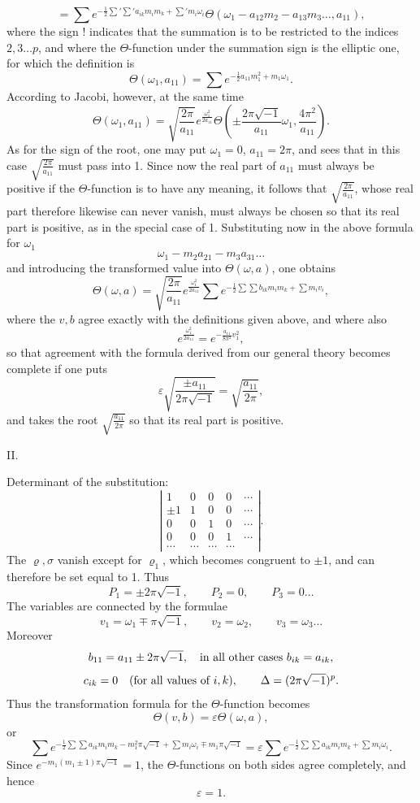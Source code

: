\documentclass[10pt]{article}
\begin{document}
\[
=\sum e^{-\frac12\sum{}'\sum{}'a_{ik}m_im_k+\sum{}'m_i\omega_i}
\Theta(\omega_1-a_{12}m_2-a_{13}m_3\ldots,a_{11}),
\]
where the sign \(!\) indicates that the summation is to be restricted to the indices \(2,3\ldots p\), and where the \(\Theta\)-function under the summation sign is the elliptic one, for which the definition is
\[
\Theta(\omega_1,a_{11})=\sum e^{-\frac12a_{11}m_1^2+m_1\omega_1}.
\]
According to Jacobi, however, at the same time
\[
\Theta(\omega_1,a_{11})=\sqrt{\frac{2\pi}{a_{11}}}
 e^{\frac{\omega_1^2}{2a_{11}}}
\Theta\left(\pm\frac{2\pi\sqrt{-1}}{a_{11}}\omega_1,\frac{4\pi^2}{a_{11}}\right).
\]
As for the sign of the root, one may put \(\omega_1=0\), \(a_{11}=2\pi\), and sees that in this case \(\sqrt{\frac{2\pi}{a_{11}}}\) must pass into 1. Since now the real part of \(a_{11}\) must always be positive if the \(\Theta\)-function is to have any meaning, it follows that \(\sqrt{\frac{2\pi}{a_{11}}}\), whose real part therefore likewise can never vanish, must always be chosen so that its real part is positive, as in the special case of 1. Substituting now in the above formula for \(\omega_1\)
\[
\omega_1-m_2a_{21}-m_3a_{31}\ldots
\]
and introducing the transformed value into \(\Theta(\omega,a)\), one obtains
\[
\Theta(\omega,a)=\sqrt{\frac{2\pi}{a_{11}}}e^{\frac{\omega_1^2}{2a_{11}}}\sum e^{-\frac12\sum\sum b_{ik}m_im_k+\sum m_iv_i},
\]
where the \(v,b\) agree exactly with the definitions given above, and where also
\[
e^{\frac{\omega_1^2}{2a_{11}}}=e^{-\frac{a_{11}}{8\pi^2}v_1^2},
\]
so that agreement with the formula derived from our general theory becomes complete if one puts
\[
\varepsilon\sqrt{\frac{\pm a_{11}}{2\pi\sqrt{-1}}}=\sqrt{\frac{a_{11}}{2\pi}},
\]
and takes the root \(\sqrt{\frac{a_{11}}{2\pi}}\) so that its real part is positive.

\begin{center}II.\end{center}

Determinant of the substitution:
\[
\left|\begin{array}{ccccc}
1&0&0&0&\cdots\\
\pm1&1&0&0&\cdots\\
0&0&1&0&\cdots\\
0&0&0&1&\cdots\\
\cdots&\cdots&\cdots&\cdots&
\end{array}\right|.
\]
The \(\varrho,\sigma\) vanish except for \(\varrho_1\), which becomes congruent to \(\pm1\), and can therefore be set equal to 1. Thus
\[
P_1=\pm2\pi\sqrt{-1},\qquad P_2=0,
\qquad P_3=0\ldots
\]
The variables are connected by the formulae
\[
v_1=\omega_1\mp\pi\sqrt{-1},\qquad
v_2=\omega_2,
\qquad v_3=\omega_3\ldots
\]
Moreover
\[
b_{11}=a_{11}\pm2\pi\sqrt{-1},\quad
\hbox{in all other cases }b_{ik}=a_{ik},
\]
\[
c_{ik}=0\quad(\hbox{for all values of }i,k),
\qquad\Delta=(2\pi\sqrt{-1})^p.
\]
Thus the transformation formula for the \(\Theta\)-function becomes
\[
\Theta(v,b)=\varepsilon\Theta(\omega,a),
\]
or
\[
\sum e^{-\frac12\sum\sum a_{ik}m_im_k-m_1^2\pi\sqrt{-1}+\sum m_i\omega_i\mp m_1\pi\sqrt{-1}}
=\varepsilon\sum e^{-\frac12\sum\sum a_{ik}m_im_k+\sum m_i\omega_i}.
\]
Since \(e^{-m_1(m_1\pm1)\pi\sqrt{-1}}=1\), the \(\Theta\)-functions on both sides agree completely, and hence
\[
\varepsilon=1.
\]
\end{document}
